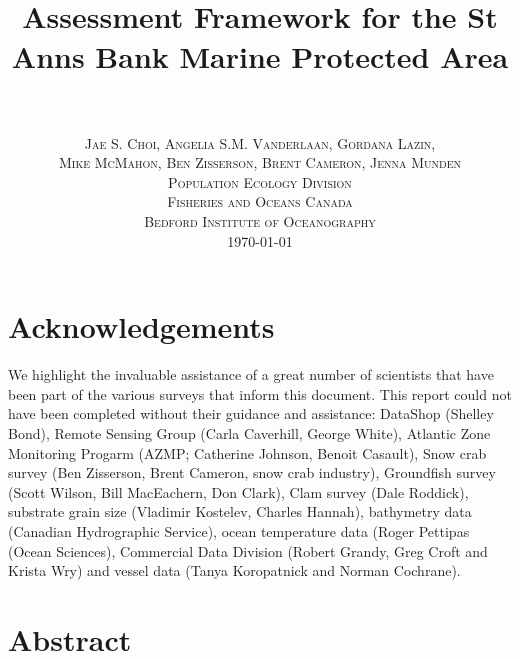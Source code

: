 \documentclass[letterpaper,portrait,11pt]{scrartcl}
\title{
		\usefont{OT1}{bch}{b}{n}
		\horrule{0.5pt} \\[0.4cm]
		\huge Assessment Framework for the St Anns Bank Marine Protected Area  \\
		\horrule{2pt} \\[1.0cm]
}
\author{
		\normalfont \normalsize  \textsc{Jae S. Choi, Angelia S.M. Vanderlaan, Gordana Lazin,} \\
    \normalfont \normalsize  \textsc{Mike McMahon,  Ben Zisserson, Brent Cameron, Jenna Munden} \\ [25pt]		
		\normalfont \normalsize \textsc{Population Ecology Division} \\ 
    \normalfont \normalsize \textsc{Fisheries and Oceans Canada} \\ 
    \normalfont \normalsize \textsc{Bedford Institute of Oceanography} \\ [25pt]
    \normalsize \textsc{\today}
}
\date{}
\numberwithin{equation}{section}		%
\numberwithin{figure}{section}		%
\numberwithin{table}{section}				%
\newcommand*{\D}{.}
\newcommand{\biodata}{\string~/bio\D data}   %
\newcommand{\mpa}{\biodata/bio\D indicators/mpa}  %
\begin{document}
% 

\setlength{\parskip}{12 pt} %
\setlength{\parindent}{0cm}
\setlength{\floatsep}{2cm}
\setcounter{tocdepth}{2} %
\setcounter{secnumdepth}{3} %
\tableofcontents 

\section*{Acknowledgements}

We highlight the invaluable assistance of a great number of scientists that have been part of the various surveys that inform this document. This report could not have been completed without their guidance and assistance: DataShop (Shelley Bond), Remote Sensing Group (Carla Caverhill, George White), Atlantic Zone Monitoring Progarm (AZMP; Catherine Johnson, Benoit Casault), Snow crab survey (Ben Zisserson, Brent Cameron, snow crab industry), Groundfish survey (Scott Wilson, Bill MacEachern, Don Clark), Clam survey (Dale Roddick), substrate grain size (Vladimir Kostelev, Charles Hannah), bathymetry data (Canadian Hydrographic Service), ocean temperature data (Roger Pettipas (Ocean Sciences), Commercial Data Division (Robert Grandy, Greg Croft and Krista Wry) and vessel data (Tanya Koropatnick and Norman Cochrane).

\section*{Abstract}
\end{document}

